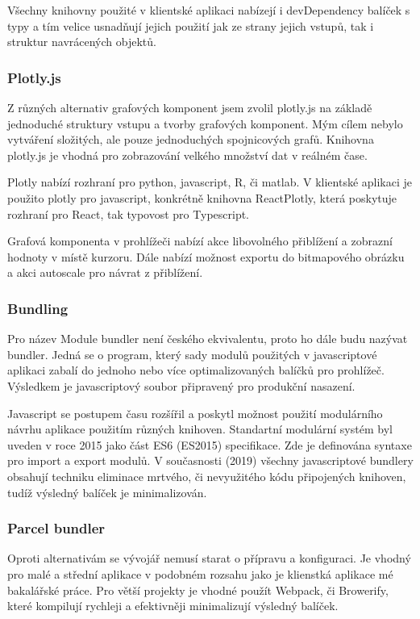 \documentclass[FM,BP]{tulthesis}
\begin{document}
                Všechny knihovny použité v klientské aplikaci nabízejí i devDependency balíček s typy a 
                tím velice usnadňují jejich použití jak ze strany jejich vstupů, tak i struktur navrácených objektů. \cite{12}

            \subsubsection{Plotly.js}
                Z různých alternativ grafových komponent jsem zvolil plotly.js na základě jednoduché struktury vstupu a tvorby grafových komponent. 
                Mým cílem nebylo vytváření složitých, ale pouze jednoduchých spojnicových grafů. 
                Knihovna plotly.js je vhodná pro zobrazování velkého množství dat v reálném čase.\cite{14}

                Plotly nabízí rozhraní pro python, javascript, R, či matlab. 
                V klientské aplikaci je použito plotly pro javascript, konkrétně knihovna ReactPlotly, která poskytuje rozhraní pro React, tak typovost pro Typescript. \cite{13}

                Grafová komponenta v prohlížeči nabízí akce libovolného přiblížení a zobrazní hodnoty v místě kurzoru. 
                Dále nabízí možnost exportu do bitmapového obrázku a akci autoscale pro návrat z přiblížení.

            \subsubsection{Bundling}
                Pro název Module bundler není českého ekvivalentu, proto ho dále budu nazývat bundler. 
                Jedná se o program, který sady modulů použitých v javascriptové aplikaci zabalí do jednoho nebo více optimalizovaných balíčků pro prohlížeč. 
                Výsledkem je javascriptový soubor připravený pro produkční nasazení.\cite{15}

                Javascript se postupem času rozšířil a poskytl možnost použití modulárního návrhu aplikace použitím různých knihoven. 
                Standartní modulární systém byl uveden v roce 2015 jako část ES6 (ES2015) specifikace. \cite{24}
                Zde je definována syntaxe pro import a export modulů. 
                V současnosti (2019) všechny javascriptové bundlery obsahují techniku eliminace mrtvého, či nevyužitého kódu připojených knihoven, tudíž výsledný balíček je minimalizován. \cite{16}

            \subsubsection{Parcel bundler}
                Oproti alternativám se vývojář nemusí starat o přípravu a konfiguraci. 
                Je vhodný pro malé a střední aplikace v podobném rozsahu jako je klienstká aplikace mé bakalářské práce. 
                Pro větší projekty je vhodné použít Webpack, či Browerify, které kompilují rychleji a efektivněji minimalizují výsledný balíček.\cite{17}
\end{document}
